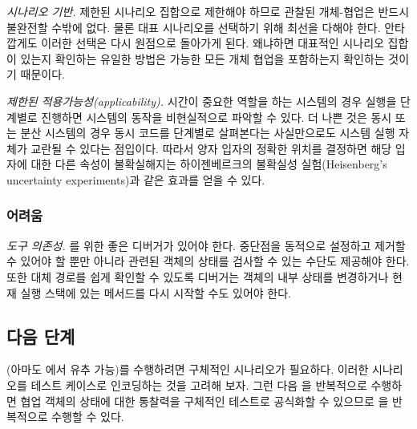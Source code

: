 \documentclass[a4paper,10pt,twoside]{book}
\begin{document}
\begin{bulletlist}
\item \emph{시나리오 기반.}
제한된 시나리오 집합으로 제한해야 하므로 관찰된 개체-협업은 반드시 불완전할 수밖에 없다. 물론 대표 시나리오를 선택하기 위해 최선을 다해야 한다. 안타깝게도 이러한 선택은 다시 원점으로 돌아가게 된다. 왜냐하면 대표적인 시나리오 집합이 있는지 확인하는 유일한 방법은 가능한 모든 개체 협업을 포함하는지 확인하는 것이기 때문이다.

\item \emph{제한된 적용가능성(applicability).}
시간이 중요한 역할을 하는 시스템의 경우 실행을 단계별로 진행하면 시스템의 동작을 비현실적으로 파악할 수 있다. 더 나쁜 것은 동시 또는 분산 시스템의 경우 동시 코드를 단계별로 살펴본다는 사실만으로도 시스템 실행 자체가 교란될 수 있다는 점입이다. 따라서 양자 입자의 정확한 위치를 결정하면 해당 입자에 대한 다른 속성이 불확실해지는 하이젠베르크의 불확실성 실험(Heisenberg's uncertainty experiments)과 같은 효과를 얻을 수 있다.
\end{bulletlist}

\subsubsection*{어려움}

\begin{bulletlist}
\item \emph{도구 의존성.}
를 위한 좋은 디버거가 있어야 한다. 중단점을 동적으로 설정하고 제거할 수 있어야 할 뿐만 아니라 관련된 객체의 상태를 검사할 수 있는 수단도 제공해야 한다. 또한 대체 경로를 쉽게 확인할 수 있도록 디버거는 객체의 내부 상태를 변경하거나 현재 실행 스택에 있는 메서드를 다시 시작할 수도 있어야 한다.
\end{bulletlist}

\subsection*{다음 단계}

(아마도 에서 유추 가능)를 수행하려면 구체적인 시나리오가 필요하다. 이러한 시나리오를 테스트 케이스로 인코딩하는 것을 고려해 보자. 그런 다음 을 반복적으로 수행하면 협업 객체의 상태에 대한 통찰력을 구체적인 테스트로 공식화할 수 있으므로 을 반복적으로 수행할 수 있다.
\end{document}
